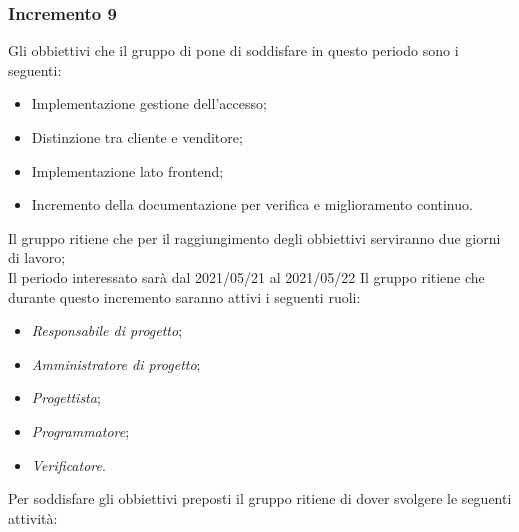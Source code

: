 \subsubsection{Incremento 9}
Gli obbiettivi che il gruppo di pone di soddisfare in questo periodo sono i seguenti:
\begin{itemize}
    \item Implementazione gestione dell'accesso;
    \item Distinzione tra cliente e venditore;
    \item Implementazione lato frontend;
    \item Incremento della documentazione per verifica e miglioramento continuo.
\end{itemize}
Il gruppo ritiene che per il raggiungimento degli obbiettivi serviranno due giorni di lavoro;\\
Il periodo interessato sarà dal 2021/05/21 al 2021/05/22
Il gruppo ritiene che durante questo incremento saranno attivi i seguenti ruoli:
\begin{itemize}
    \item \textit{Responsabile di progetto};
    \item \textit{Amministratore di progetto};
    \item \textit{Progettista};
    \item \textit{Programmatore};
    \item \textit{Verificatore}.
\end{itemize}
Per soddisfare gli obbiettivi preposti il gruppo ritiene di dover svolgere le seguenti attività:
